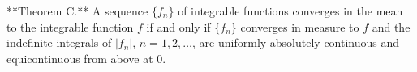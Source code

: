 **Theorem C.** A sequence $\{f_n\}$ of integrable functions converges in the mean to the integrable function $f$ if and only if $\{f_n\}$ converges in measure to $f$ and the indefinite integrals of $|f_n|$, $n=1,2,\dots$, are uniformly absolutely continuous and equicontinuous from above at $0$.
